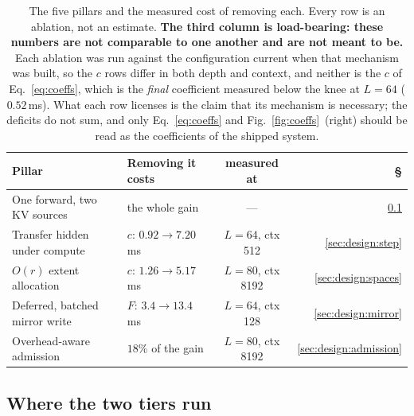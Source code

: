 \begin{table}[t]
\centering
\small
\begin{tabular}{llcr}
\toprule
Pillar & Removing it costs & measured at & \S \\
\midrule
One forward, two KV sources & the whole gain & --- & \ref{sec:design:exec} \\
Transfer hidden under compute & $c$: $0.92 \to 7.20$\,ms & $L{=}64$, ctx 512 & \ref{sec:design:step} \\
$O(r)$ extent allocation & $c$: $1.26 \to 5.17$\,ms & $L{=}80$, ctx 8192 & \ref{sec:design:spaces} \\
Deferred, batched mirror write & $F$: $3.4 \to 13.4$\,ms & $L{=}64$, ctx 128 & \ref{sec:design:mirror} \\
Overhead-aware admission & $18\%$ of the gain & $L{=}80$, ctx 8192 & \ref{sec:design:admission} \\
\bottomrule
\end{tabular}
\caption{The five pillars and the measured cost of removing each. Every row is an
ablation, not an estimate. \textbf{The third column is load-bearing: these numbers
are not comparable to one another and are not meant to be.} Each ablation was run
against the configuration current when that mechanism was built, so the $c$ rows
differ in both depth and context, and neither is the $c$ of Eq.~\ref{eq:coeffs},
which is the \emph{final} coefficient measured below the knee at $L{=}64$
($0.52$\,ms). What each row licenses is the claim that its mechanism is necessary;
the deficits do not sum, and only Eq.~\ref{eq:coeffs} and
Fig.~\ref{fig:coeffs}~(right) should be read as the coefficients of the shipped
system.}
\label{tab:pillars}
\end{table}

\subsection{Where the two tiers run}
\label{sec:design:exec}



